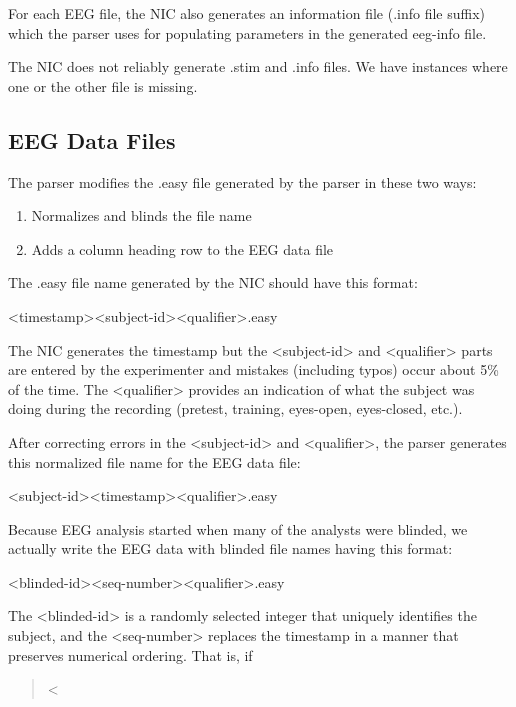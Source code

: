 \documentclass[letterpaper,10pt,english]{sphinxmanual}
\begin{document}
For each EEG file, the NIC also generates an information file (.info
file suffix) which the parser uses for populating parameters in the
generated eeg-info file.

The NIC does not reliably generate .stim and .info files. We have
instances where one or the other file is missing.


\subsection{EEG Data Files}
\label{\detokenize{Data_Definations_Phase1B:eeg-data-files}}
The parser modifies the .easy file generated by the parser in these two
ways:
\begin{enumerate}
\item {} 
Normalizes and blinds the file name

\item {} 
Adds a column heading row to the EEG data file

\end{enumerate}

The .easy file name generated by the NIC should have this format:

\textless{}timestamp\textgreater{}\textless{}subject-id\textgreater{}\textless{}qualifier\textgreater{}.easy

The NIC generates the timestamp but the \textless{}subject-id\textgreater{} and \textless{}qualifier\textgreater{}
parts are entered by the experimenter and mistakes (including typos)
occur about 5\% of the time. The \textless{}qualifier\textgreater{} provides an indication of
what the subject was doing during the recording (pretest, training,
eyes-open, eyes-closed, etc.).

After correcting errors in the \textless{}subject-id\textgreater{} and \textless{}qualifier\textgreater{}, the parser
generates this normalized file name for the EEG data file:

\textless{}subject-id\textgreater{}\textless{}timestamp\textgreater{}\textless{}qualifier\textgreater{}.easy

Because EEG analysis started when many of the analysts were blinded, we
actually write the EEG data with blinded file names having this format:

\textless{}blinded-id\textgreater{}\textless{}seq-number\textgreater{}\textless{}qualifier\textgreater{}.easy

The \textless{}blinded-id\textgreater{} is a randomly selected integer that uniquely identifies
the subject, and the \textless{}seq-number\textgreater{} replaces the timestamp in a manner
that preserves numerical ordering. That is, if
\begin{quote}

 \textless{} 
\end{quote}
\end{document}
